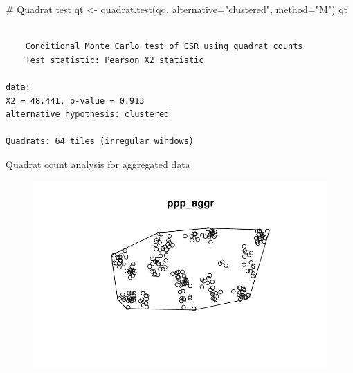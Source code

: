 \documentclass[
  letterpaper,
  DIV=11,
  numbers=noendperiod]{scrreprt}
\newenvironment{Shaded}{\begin{snugshade}}{\end{snugshade}}
\newcommand{\AttributeTok}[1]{\textcolor[rgb]{0.40,0.45,0.13}{#1}}
\newcommand{\CommentTok}[1]{\textcolor[rgb]{0.37,0.37,0.37}{#1}}
\newcommand{\DocumentationTok}[1]{\textcolor[rgb]{0.37,0.37,0.37}{\textit{#1}}}
\newcommand{\FunctionTok}[1]{\textcolor[rgb]{0.28,0.35,0.67}{#1}}
\newcommand{\NormalTok}[1]{\textcolor[rgb]{0.00,0.23,0.31}{#1}}
\newcommand{\OtherTok}[1]{\textcolor[rgb]{0.00,0.23,0.31}{#1}}
\newcommand{\SpecialCharTok}[1]{\textcolor[rgb]{0.37,0.37,0.37}{#1}}
\newcommand{\StringTok}[1]{\textcolor[rgb]{0.13,0.47,0.30}{#1}}
\begin{document}
\begin{Shaded}
\begin{Highlighting}[]
\CommentTok{\# Quadrat test}
\NormalTok{qt }\OtherTok{\textless{}{-}} \FunctionTok{quadrat.test}\NormalTok{(qq, }\AttributeTok{alternative=}\StringTok{"clustered"}\NormalTok{, }\AttributeTok{method=}\StringTok{"M"}\NormalTok{)}
\NormalTok{qt}
\end{Highlighting}
\end{Shaded}

\begin{verbatim}

    Conditional Monte Carlo test of CSR using quadrat counts
    Test statistic: Pearson X2 statistic

data:  
X2 = 48.441, p-value = 0.913
alternative hypothesis: clustered

Quadrats: 64 tiles (irregular windows)
\end{verbatim}

Quadrat count analysis for aggregated data

\begin{Shaded}
\end{Shaded}

\begin{figure}[H]

{\centering \includegraphics{spatial-tests_files/figure-pdf/unnamed-chunk-35-1.pdf}

}

\end{figure}
\end{document}
